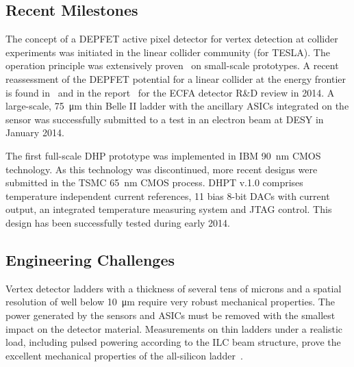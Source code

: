 \subsection{Recent Milestones}
The concept of a DEPFET active pixel detector for vertex detection at collider experiments was initiated in the linear collider community (for TESLA).
The operation principle was extensively proven~\cite{Andricek:2011zza,Velthuis:2008zza} on small-scale prototypes. A recent reassessment of the DEPFET potential for a linear collider at the energy frontier is found in~\cite{6484214} and in the report~\cite{depfet:ecfaReport} for the ECFA detector R\&D review in 2014.
A large-scale, \SI{75}{\micro\meter} thin Belle II ladder with the ancillary ASICs integrated on the sensor was successfully submitted to a test in an electron beam at DESY in January 2014\cite{Marinas:2014iza}.


The first full-scale DHP prototype was implemented in IBM \SI{90}{nm} CMOS technology. As this technology was discontinued, more recent designs were submitted in the TSMC \SI{65}{nm} CMOS process. DHPT v.1.0 comprises temperature independent current references, 11 bias 8-bit DACs with current output, an integrated temperature measuring system and JTAG control. This design has been successfully tested during early 2014\cite{Kishishita:2014maa}.

\subsection{Engineering Challenges}
Vertex detector ladders with a thickness of several tens of microns and a spatial resolution of well below \SI{10}{\micro\meter} require very robust mechanical properties. The power generated by the sensors and ASICs must be removed with the smallest impact on the detector material.
Measurements on thin ladders under a realistic load, including pulsed powering according to the ILC beam structure, prove the excellent mechanical properties of the all-silicon ladder~\cite{thermomech}.


